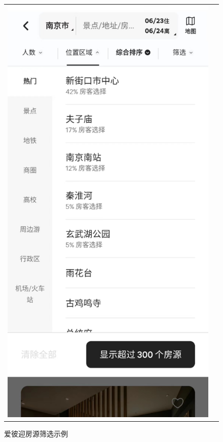 \documentclass{article}
\begin{document}
\begin{figure}[htbp]
\begin{tabular}{cc}
\begin{minipage}[t]{2in}
        \caption{贝壳找房房源筛选示例}
        \label{贝壳找房}
        \end{minipage}
        \begin{minipage}[t]{2in}
        \centering
        \includegraphics[height=0.4\textheight]{./pic/爱彼迎.jpg}
        \caption{爱彼迎房源筛选示例}
        \label{爱彼迎}
        \end{minipage}
    \end{tabular}
\end{figure}
\end{document}
